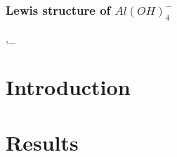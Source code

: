 \documentclass[]{article}
\begin{document}
\hypertarget{lewis-structure-of-aloh_4--}{%
\subsubsection{\texorpdfstring{Lewis structure of
\(Al(OH)_4 ^{-}\)}{Lewis structure of Al(OH)\_4 \^{}\{-\}}}\label{lewis-structure-of-aloh_4--}}

,\_

\hypertarget{introduction}{%
\section{Introduction}\label{introduction}}

\hypertarget{results}{%
\section{Results}\label{results}}
\end{document}
